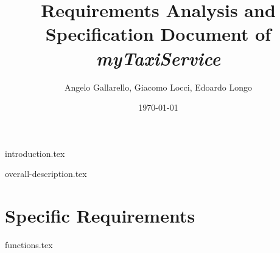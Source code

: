 \documentclass[12pt, a4paper]{article}
\begin{document}
\title{Requirements Analysis and Specification Document of \emph{myTaxiService}}

\author{Angelo Gallarello, Giacomo Locci, Edoardo Longo}
\date{\today}
\maketitle

\newpage

\tableofcontents

\newpage


{introduction.tex}

{overall-description.tex}

\section{Specific Requirements} %
\label{sec:specific_rquirements}


{functions.tex}

\end{document}
